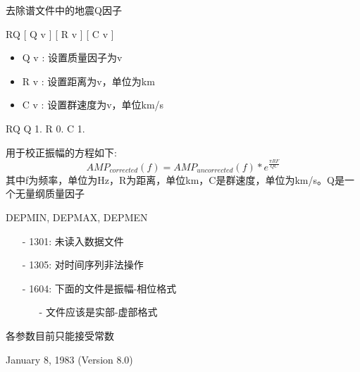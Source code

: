 \label{cmd:rq}

去除谱文件中的地震Q因子

RQ [ Q v ] [ R v ] [ C v ]

\begin{itemize}
\item Q v : 设置质量因子为v 
\item R v : 设置距离为v，单位为km 
\item C v : 设置群速度为v，单位km/s 
\end{itemize}

RQ Q 1. R 0. C 1.

用于校正振幅的方程如下:
\[ AMP_{corrected}(f) = AMP_{uncorrected}(f) * e^{\frac{\pi R F}{Q C}} \]
其中f为频率，单位为Hz，R为距离，单位km，C是群速度，单位为km/s。Q是一个无量纲质量因子

DEPMIN, DEPMAX, DEPMEN

\begin{itemize}
\item[-]1301: 未读入数据文件
\item[-]1305: 对时间序列非法操作
\end{itemize}

\begin{itemize}
\item[-]1604: 下面的文件是振幅-相位格式
	\begin{itemize}
	\item[-]文件应该是实部-虚部格式
	\end{itemize}
\end{itemize}

各参数目前只能接受常数

January 8, 1983 (Version 8.0)
